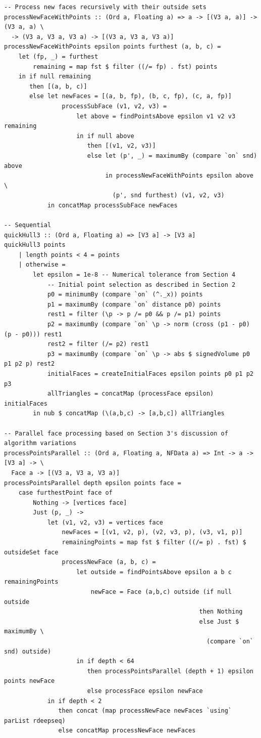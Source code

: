 \documentclass[12pt]{article}
\begin{document}
\begin{verbatim}
-- Process new faces recursively with their outside sets
processNewFaceWithPoints :: (Ord a, Floating a) => a -> [(V3 a, a)] -> (V3 a, a) \
  -> (V3 a, V3 a, V3 a) -> [(V3 a, V3 a, V3 a)]
processNewFaceWithPoints epsilon points furthest (a, b, c) =
    let (fp, _) = furthest
        remaining = map fst $ filter ((/= fp) . fst) points
    in if null remaining
       then [(a, b, c)]
       else let newFaces = [(a, b, fp), (b, c, fp), (c, a, fp)]
                processSubFace (v1, v2, v3) =
                    let above = findPointsAbove epsilon v1 v2 v3 remaining
                    in if null above
                       then [(v1, v2, v3)]
                       else let (p', _) = maximumBy (compare `on` snd) above
                            in processNewFaceWithPoints epsilon above \
                              (p', snd furthest) (v1, v2, v3)
            in concatMap processSubFace newFaces

-- Sequential
quickHull3 :: (Ord a, Floating a) => [V3 a] -> [V3 a]
quickHull3 points 
    | length points < 4 = points
    | otherwise = 
        let epsilon = 1e-8 -- Numerical tolerance from Section 4
            -- Initial point selection as described in Section 2
            p0 = minimumBy (compare `on` (^._x)) points
            p1 = maximumBy (compare `on` distance p0) points
            rest1 = filter (\p -> p /= p0 && p /= p1) points
            p2 = maximumBy (compare `on` \p -> norm (cross (p1 - p0) (p - p0))) rest1
            rest2 = filter (/= p2) rest1
            p3 = maximumBy (compare `on` \p -> abs $ signedVolume p0 p1 p2 p) rest2
            initialFaces = createInitialFaces epsilon points p0 p1 p2 p3
            allTriangles = concatMap (processFace epsilon) initialFaces
        in nub $ concatMap (\(a,b,c) -> [a,b,c]) allTriangles

-- Parallel face processing based on Section 3's discussion of algorithm variations
processPointsParallel :: (Ord a, Floating a, NFData a) => Int -> a -> [V3 a] -> \
  Face a -> [(V3 a, V3 a, V3 a)]
processPointsParallel depth epsilon points face =
    case furthestPoint face of
        Nothing -> [vertices face]
        Just (p, _) -> 
            let (v1, v2, v3) = vertices face
                newFaces = [(v1, v2, p), (v2, v3, p), (v3, v1, p)]
                remainingPoints = map fst $ filter ((/= p) . fst) $ outsideSet face
                processNewFace (a, b, c) = 
                    let outside = findPointsAbove epsilon a b c remainingPoints
                        newFace = Face (a,b,c) outside (if null outside 
                                                      then Nothing 
                                                      else Just $ maximumBy \
                                                        (compare `on` snd) outside)
                    in if depth < 64
                       then processPointsParallel (depth + 1) epsilon points newFace
                       else processFace epsilon newFace
            in if depth < 2
               then concat (map processNewFace newFaces `using` parList rdeepseq)
               else concatMap processNewFace newFaces


\end{verbatim}
\end{document}
